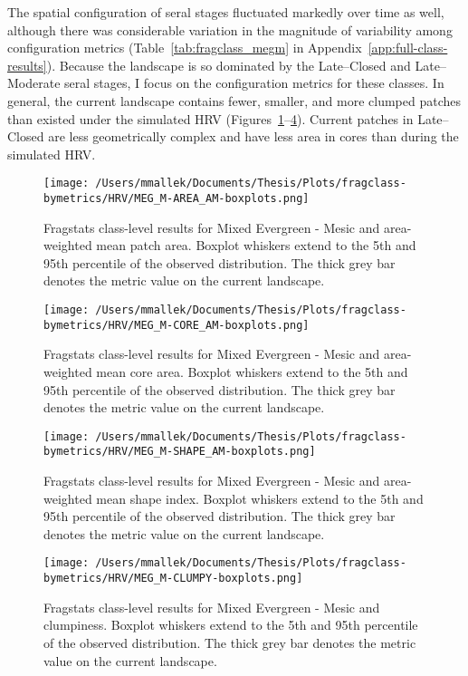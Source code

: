 The spatial configuration of seral stages fluctuated markedly over time as well, although there was considerable variation in the magnitude of variability among configuration metrics (Table~\ref{tab:fragclass_megm} in Appendix~\ref{app:full-class-results}). Because the landscape is so dominated by the Late--Closed and Late--Moderate seral stages, I focus on the configuration metrics for these classes. In general, the current landscape contains fewer, smaller, and more clumped patches than existed under the simulated HRV (Figures~\ref{fig:megm_areaam}--\ref{fig:megm_clumpy}). Current patches in Late--Closed are less geometrically complex and have less area in cores than during the simulated HRV.


\begin{figure}[!htbp]
\centering
    \texttt{[image: /Users/mmallek/Documents/Thesis/Plots/fragclass-bymetrics/HRV/MEG\_M-AREA\_AM-boxplots.png]}
  \caption{Fragstats class-level results for Mixed Evergreen - Mesic and area-weighted mean patch area. Boxplot whiskers extend to the 5th and 95th percentile of the observed distribution. The thick grey bar denotes the metric value on the current landscape.}
  \label{fig:megm_areaam}
\end{figure}


\begin{figure}[!htbp]
\centering
    \texttt{[image: /Users/mmallek/Documents/Thesis/Plots/fragclass-bymetrics/HRV/MEG\_M-CORE\_AM-boxplots.png]}
  \caption{Fragstats class-level results for Mixed Evergreen - Mesic and area-weighted mean core area. Boxplot whiskers extend to the 5th and 95th percentile of the observed distribution. The thick grey bar denotes the metric value on the current landscape.}
  \label{fig:megm_coream}
\end{figure}


\begin{figure}[!htbp]
\centering
    \texttt{[image: /Users/mmallek/Documents/Thesis/Plots/fragclass-bymetrics/HRV/MEG\_M-SHAPE\_AM-boxplots.png]}
  \caption{Fragstats class-level results for Mixed Evergreen - Mesic and area-weighted mean shape index. Boxplot whiskers extend to the 5th and 95th percentile of the observed distribution. The thick grey bar denotes the metric value on the current landscape.}
  \label{fig:megm_shapeam}
\end{figure}


\begin{figure}[!htbp]
\centering
    \texttt{[image: /Users/mmallek/Documents/Thesis/Plots/fragclass-bymetrics/HRV/MEG\_M-CLUMPY-boxplots.png]}
  \caption{Fragstats class-level results for Mixed Evergreen - Mesic and clumpiness. Boxplot whiskers extend to the 5th and 95th percentile of the observed distribution. The thick grey bar denotes the metric value on the current landscape.}
  \label{fig:megm_clumpy}
\end{figure}

